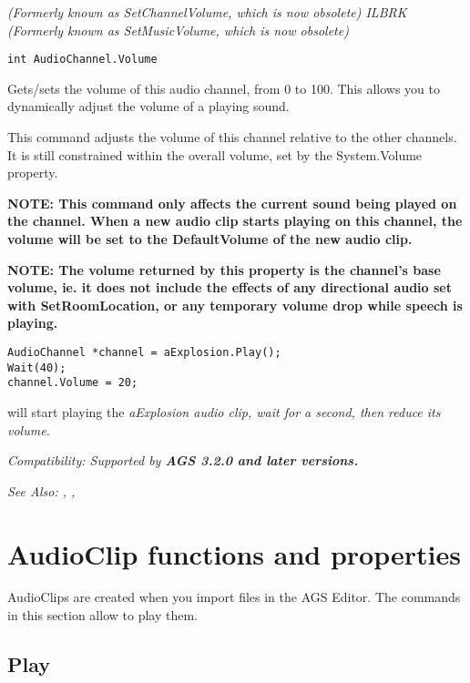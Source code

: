 \it{(Formerly known as SetChannelVolume, which is now obsolete)} ILBRK
\it{(Formerly known as SetMusicVolume, which is now obsolete)}

\begin{verbatim}
int AudioChannel.Volume
\end{verbatim}
Gets/sets the volume of this audio channel, from 0 to 100. This allows you to dynamically
adjust the volume of a playing sound.

This command adjusts the volume of this channel relative to the other channels.
It is still constrained within the overall volume, set by the System.Volume property.

\bf{NOTE:} This command only affects the current sound being played on the channel.
When a new audio clip starts playing on this channel, the volume will be set to the
DefaultVolume of the new audio clip.

\bf{NOTE:} The volume returned by this property is the channel's base volume, ie. it does
not include the effects of any directional audio set with SetRoomLocation, or any temporary
volume drop while speech is playing.

\begin{verbatim}
AudioChannel *channel = aExplosion.Play();
Wait(40);
channel.Volume = 20;
\end{verbatim}
will start playing the \it{aExplosion} audio clip, wait for a second, then reduce its volume.

\it{Compatibility:} Supported by \bf{AGS 3.2.0} and later versions.

\it{See Also:} ,
, 


\section{AudioClip functions and properties}\label{AudioClipCommands}%

AudioClips are created when you import files in the AGS Editor. The commands in this
section allow to play them.


\subsection{Play}\label{AudioClip.Play}%

